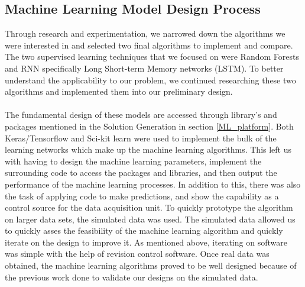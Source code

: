 \subsection{Machine Learning Model Design Process}
Through research and experimentation, we narrowed down the algorithms we were interested in and selected two final algorithms to implement and compare. The two supervised learning techniques that we focused on were Random Forests and RNN specifically Long Short-term Memory networks (LSTM). To better understand the applicability to our problem, we continued researching these two algorithms and implemented them into our preliminary design. \\\\
The fundamental design of these models are accessed through library's and packages mentioned in the Solution Generation in section \ref{ML_platform}. Both Keras/Tensorflow and Sci-kit learn were used to implement the bulk of the learning networks which make up the machine learning algorithms. This left us with having to design the machine learning parameters, implement the surrounding code to access the packages and libraries, and then output the performance of the machine learning processes. In addition to this, there was also the task of applying code to make predictions, and show the capability as a control source for the data acquisition unit. To quickly prototype the algorithm on larger data sets, the simulated data was used. The simulated data allowed us to quickly asses the feasibility of the machine learning algorithm and quickly iterate on the design to improve it. As mentioned above, iterating on software was simple with the help of revision control software. Once real data was obtained, the machine learning algorithms proved to be well designed because of the previous work done to validate our designs on the simulated data. \\\\